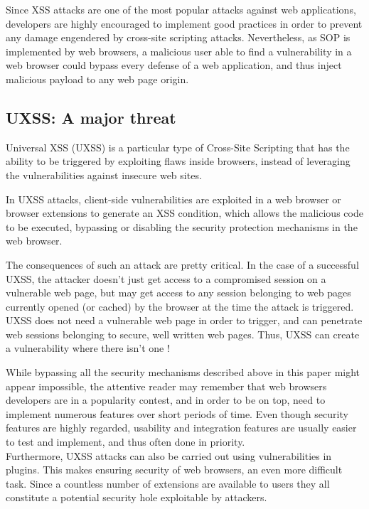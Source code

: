 \documentclass[journal]{IEEEtran}
\begin{document}
\medskip

Since XSS attacks are one of the most popular attacks against web applications, developers are highly encouraged to implement good practices in order to prevent any damage engendered by cross-site scripting attacks. Nevertheless, as SOP is implemented by web browsers, a malicious user able to find a vulnerability in a web browser could bypass every defense of a web application, and thus inject malicious payload to any web page origin.

\subsection{UXSS: A major threat}

Universal XSS (UXSS) is a particular type of Cross-Site Scripting that has the ability to be triggered by exploiting flaws inside browsers, instead of leveraging the vulnerabilities against insecure web sites.

\bigskip


\bigskip

In UXSS attacks, client-side vulnerabilities are exploited in a web browser or browser extensions to generate an XSS condition, which allows the malicious code to be executed, bypassing or disabling the security protection mechanisms in the web browser.

\medskip

The consequences of such an attack are pretty critical. In the case of a successful UXSS, the attacker doesn’t just get access to a compromised session on a vulnerable web page, but may get access to any session belonging to web pages currently opened (or cached) by the browser at the time the attack is triggered. UXSS does not need a vulnerable web page in order to trigger, and can penetrate web sessions belonging to secure, well written web pages. Thus, UXSS can create a vulnerability where there isn’t one !

\medskip

While bypassing all the security mechanisms described above in this paper might appear impossible, 
the attentive reader may remember that web browsers developers are in a popularity contest, and in order to be on top, need to implement numerous features over short periods of time. Even though security features are highly regarded, usability and integration features are usually easier to test and implement, and thus often done in priority. \\
Furthermore, UXSS attacks can also be carried out using vulnerabilities in plugins. This makes ensuring security of web browsers, an even more difficult task. Since a countless number of extensions are available to users they all constitute a potential security hole exploitable by attackers.
\end{document}
